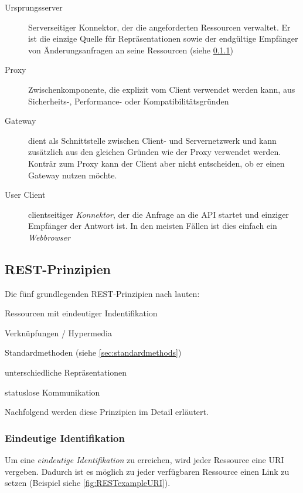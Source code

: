 \begin{description}
    \item[Ursprungsserver] 
        Serverseitiger Konnektor, der die angeforderten Ressourcen verwaltet. Er ist die einzige Quelle für Repräsentationen sowie der endgültige Empfänger von Änderungsanfragen an seine Ressourcen (siehe \cref{sec:unambigiousidentification})
    \item[Proxy] Zwischenkomponente, die explizit vom Client verwendet werden kann, aus Sicherheits-, Performance- oder Kompatibilitätsgründen
    \item[Gateway] dient als Schnittstelle zwischen Client- und Servernetzwerk und kann zusätzlich aus den gleichen Gründen wie der Proxy verwendet werden. Konträr zum Proxy kann der Client aber nicht entscheiden, ob er einen Gateway nutzen möchte.
    \item[User Client] 
        clientseitiger \emph{Konnektor}, der die Anfrage an die \gls{API} startet und einziger Empfänger der Antwort ist. In den meisten Fällen ist dies einfach ein \emph{Webbrowser}
\end{description}

\subsection{REST-Prinzipien}

Die fünf grundlegenden \gls{REST}-Prinzipien nach \cite[11 ff.]{Tilkov09} lauten:
\begin{compactitem}
    \item Ressourcen mit eindeutiger Indentifikation
    \item Verknüpfungen / Hypermedia
    \item Standardmethoden (siehe \cref{sec:standardmethods})
    \item unterschiedliche Repräsentationen
    \item statuslose Kommunikation
\end{compactitem}

Nachfolgend werden diese Prinzipien im Detail erläutert.

\subsubsection{Eindeutige Identifikation}
\label{sec:unambigiousidentification}

Um eine \emph{eindeutige Identifikation} zu erreichen, wird jeder Ressource eine \gls{URI} vergeben. Dadurch ist es möglich zu jeder verfügbaren Ressource einen Link zu setzen (Beispiel siehe \cref{fig:RESTexampleURI}).

